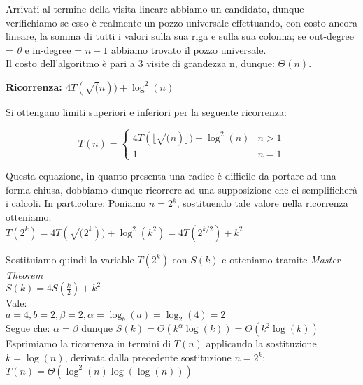 \documentclass[../cheatSheetAlgoritmi.tex]{subfiles}
\begin{document}
Arrivati al termine della visita lineare abbiamo un candidato, dunque verifichiamo se esso è realmente un pozzo universale effettuando, con costo ancora lineare, la somma di tutti i valori sulla sua riga e sulla sua colonna; se out-degree = \textit{0} e in-degree = $n - 1$ abbiamo trovato il pozzo universale.\\
Il costo dell'algoritmo è pari a 3 visite di grandezza n, dunque: $\Theta(n)$.

\bigskip
\textbf{Ricorrenza: $4T(\sqrt(n)) + \log^2(n)$}

\bigskip
Si ottengano limiti superiori e inferiori per la seguente ricorrenza:
\begin{center}
	\begin{equation*}
  		T(n)=\begin{cases}
    		4T(\lfloor \sqrt(n) \rfloor) + \log^2(n)  & \text{$n > 1$}\\
    		1 & \text{$n = 1$}
  		\end{cases}
	\end{equation*}
\end{center}

\bigskip
Questa equazione, in quanto presenta una radice è difficile da portare ad una forma chiusa, dobbiamo dunque ricorrere ad una supposizione che ci semplificherà i calcoli. In particolare:
Poniamo $n = 2^k$, sostituendo tale valore nella ricorrenza otteniamo:\\
$T(2^k) = 4T(\sqrt(2^k)) + \log^{2}(k^2)= 4T(2^{k/2}) + k^2$

\bigskip
Sostituiamo quindi la variable $T(2^k)$ con $S(k)$ e otteniamo tramite \textit{Master Theorem}\\
$S(k) = 4S(\frac{k}{2}) +k^2$ \\
Vale:\\
$a = 4, b = 2, \beta = 2, \alpha = \log_b(a) = \log_2(4) = 2$\\
Segue che: $\alpha = \beta$ dunque $S(k) = \Theta(k^\alpha \log(k)) = \Theta(k^2 \log(k))$\\
Esprimiamo la ricorrenza in termini di $T(n)$ applicando la sostituzione $k = \log(n)$, derivata dalla precedente sostituzione $n = 2^k$:\\
$T(n) = \Theta(\log^2(n)\log(\log(n)))$

 
\end{document}
